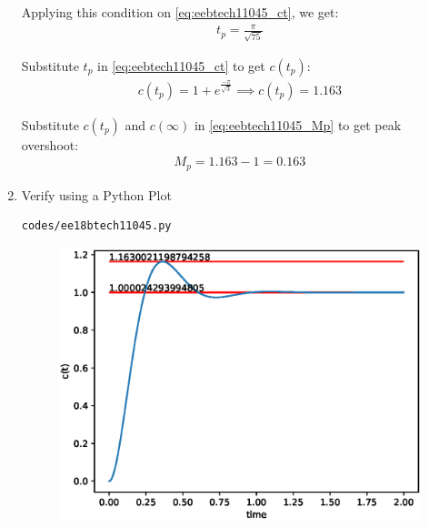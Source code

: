 \begin{enumerate}[label=\thesubsection.\arabic*.,ref=\thesubsection.\theenumi]
Applying this condition on \eqref{eq:eebtech11045_ct}, we get:
\begin{align}
    t_p = \frac{\pi}{\sqrt{75}}
\end{align}

Substitute $t_p$ in \eqref{eq:eebtech11045_ct} to get $c(t_p)$:
\begin{align}
    c(t_p) = 1 + e^\frac{-\pi}{\sqrt{3}} \implies c(t_p) = 1.163
\end{align}

Substitute $c(t_p)$ and $c(\infty)$ in \eqref{eq:eebtech11045_Mp} to get peak overshoot:
\begin{align}
    M_p = 1.163 -1 = 0.163
\end{align}

\item Verify using a Python Plot

\solution

\begin{lstlisting}
codes/ee18btech11045.py
\end{lstlisting}

\begin{figure}[!h]
    \centering
    \includegraphics[width=\columnwidth]{figs/ee18btech11045/ee18btech11045.eps}
\end{figure}

\end{enumerate}